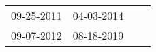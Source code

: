 \begin{supertabular}{llll}
 09-25-2011 &  04-03-2014 \\
 09-07-2012 &  08-18-2019 \\
\end{supertabular}
